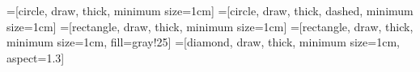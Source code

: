 %
%

\usetikzlibrary{bayesnet,positioning,fit,shapes.geometric}

=[circle, draw, thick, minimum size=1cm]
=[circle, draw, thick, dashed, minimum size=1cm]
=[rectangle, draw, thick, minimum size=1cm]
=[rectangle, draw, thick, minimum size=1cm, fill=gray!25]
=[diamond, draw, thick, minimum size=1cm, aspect=1.3]
